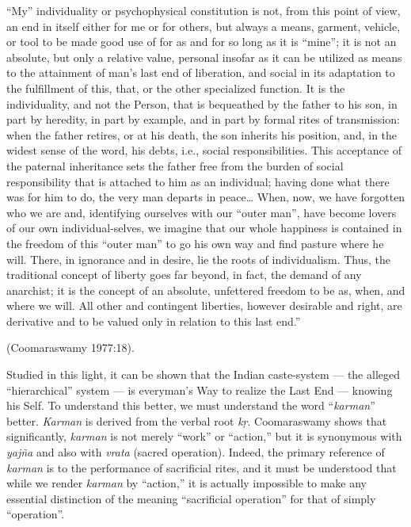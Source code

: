 \begin{myquote}
“My” individuality or psychophysical constitution is not, from this point of view, an end in itself either for me or for others, but always a means, garment, vehicle, or tool to be made good use of for as and for so long as it is “mine”; it is not an absolute, but only a relative value, personal insofar as it can be utilized as means to the attainment of man’s last end of liberation, and social in its adaptation to the fulfillment of this, that, or the other specialized function. It is the individuality, and not the Person, that is bequeathed by the father to his son, in part by heredity, in part by example, and in part by formal rites of transmission: when the father retires, or at his death, the son inherits his position, and, in the widest sense of the word, his debts, i.e., social responsibilities. This acceptance of the paternal inheritance sets the father free from the burden of social responsibility that is attached to him as an individual; having done what there was for him to do, the very man departs in peace… When, now, we have forgotten who we are and, identifying ourselves with our “outer man”, have become lovers of our own individual-selves, we imagine that our whole happiness is contained in the freedom of this “outer man” to go his own way and find pasture where he will. There, in ignorance and in desire, lie the roots of individualism. Thus, the traditional concept of liberty goes far beyond, in fact, the demand of any anarchist; it is the concept of an absolute, unfettered freedom to be as, when, and where we will. All other and contingent liberties, however desirable and right, are derivative and to be valued only in relation to this last end.”

\hfill (Coomaraswamy 1977:18).
\end{myquote}



Studied in this light, it can be shown that the Indian caste-system --- the alleged “hierarchical” system --- is everyman’s Way to realize the Last End --- knowing his Self. To understand this better, we must understand the word “{\sl karman}” better. {\sl Karman} is derived from the verbal root {\sl kṛ}. Coomaraswamy shows that significantly, {\sl karman} is not merely “work” or “action,” but it is synonymous with {\sl yajña} and also with {\sl vrata} (sacred operation). Indeed, the primary reference of {\sl karman} is to the performance of sacrificial rites, and it must be understood that while we render {\sl karman} by “action,” it is actually impossible to make any essential distinction of the meaning “sacrificial operation” for that of simply “operation”.

